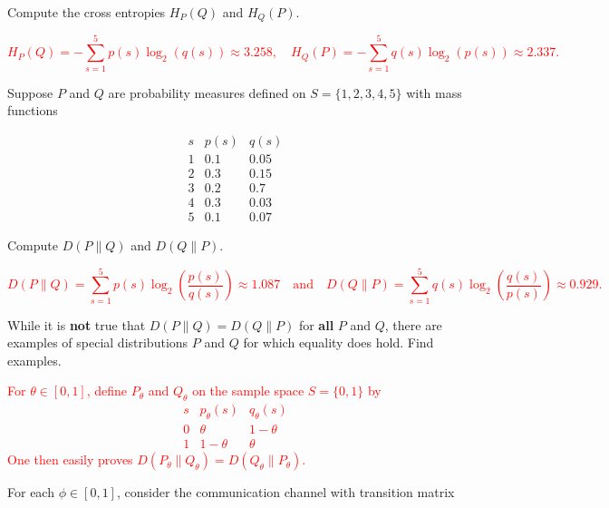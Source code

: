\documentclass[12pt,reqno]{amsart}
\begin{document}
Compute the cross entropies $H_P( Q)$ and $H_Q( P)$.

\bigskip
\textcolor{red}{
	\[H_P(  Q) = - \sum_{s=1}^5 p(s) \log_2(q(s)) \approx 3.258, \quad H_Q( P) = -\sum_{s=1}^5 q(s) \log_2(p(s)) \approx 2.337.
	\]}
\bigskip








\prob Suppose $P$ and $Q$ are probability measures defined on $S = \{1,2,3,4,5\}$ with mass functions

	\[
	\begin{array}{c|cc}
	s & p(s) & q(s) \\ \hline
	1 & 0.1 & 0.05 \\
	2 & 0.3 & 0.15 \\
	3 & 0.2 & 0.7 \\
	4 & 0.3 & 0.03 \\
	5 & 0.1 & 0.07
	\end{array}
	\]

Compute $D( P \parallel Q)$ and $D(Q\parallel P)$.

\bigskip
\textcolor{red}{
	\[D( P \parallel Q) = \sum_{s=1}^5 p(s) \log_2 \left( \frac{p(s)}{q(s)} \right) \approx 1.087 \quad \text{and} \quad D( Q \parallel P) = \sum_{s=1}^5 q(s) \log_2 \left( \frac{q(s)}{p(s)} \right) \approx 0.929.
	\]}
\bigskip










\prob While it is \textbf{not} true that $D(P\parallel Q) = D(Q \parallel P)$ for \textbf{all} $P$ and $Q$, there are examples of special distributions $P$ and $Q$ for which equality does hold. Find examples.

\bigskip
\textcolor{red}{For $\theta \in [0,1]$, define $P_\theta$ and $Q_\theta$ on the sample space $S= \{0,1\}$ by
	\[\begin{array}{c|cc}
	s & p_\theta(s) & q_\theta(s) \\ \hline
	0 & \theta & 1-\theta \\
	1 & 1 - \theta & \theta
	\end{array}
	\]
One then easily proves $D(P_\theta \parallel Q_\theta) = D(Q_\theta \parallel P_\theta)$.}
\bigskip









\prob For each $\phi \in [0,1]$, consider the communication channel with transition matrix
\end{document}
